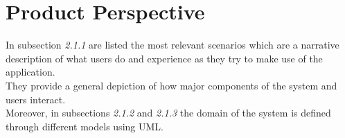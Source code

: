\section{Product Perspective}
In subsection \textit{2.1.1} are listed the most relevant scenarios which are a narrative description of what users do and experience as they try to make use of the application.\\
They provide a general depiction of how major components of the system and users interact.\\
Moreover, in subsections \textit{2.1.2} and \textit{2.1.3} the domain of the system is defined through different models using UML.



